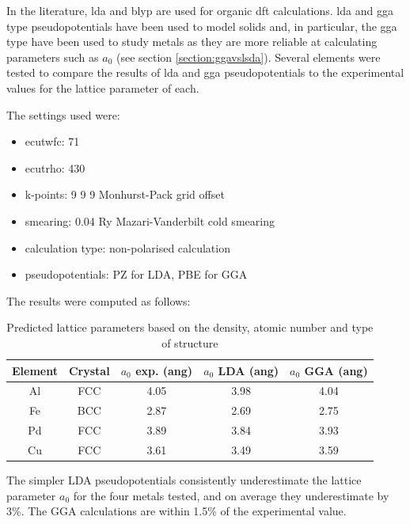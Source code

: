 In the literature, \acrshort{lda} and \acrshort{blyp} are used for organic \acrshort{dft} calculations.  \acrshort{lda} and \acrshort{gga} type pseudopotentials have been used to model solids and, in particular, the \acrshort{gga} type have been used to study metals as they are more reliable at calculating parameters such as $a_0$ (see section \ref{section:ggavslsda}).  Several elements were tested to compare the results of \acrshort{lda} and \acrshort{gga} pseudopotentials to the experimental values for the lattice parameter of each.

The settings used were:

\begin{itemize}
\item ecutwfc: 71 
\item ecutrho: 430 
\item k-points: 9 9 9 Monhurst-Pack grid offset
\item smearing: 0.04 Ry Mazari-Vanderbilt cold smearing
\item calculation type: non-polarised calculation
\item pseudopotentials: PZ for LDA, PBE for GGA
\end{itemize}

The results were computed as follows:

\begin{table}[h]
\begin{center}
\begin{tabular}{c c c c c}
\hline\hline
Element & Crystal & $a_0$ exp. (ang) & $a_0$ LDA (ang) & $a_0$ GGA (ang) \\
\hline\hline
Al     & FCC  &  4.05  &  3.98  &  4.04   \\ 
Fe     & BCC  &  2.87  &  2.69  &  2.75   \\ 
Pd     & FCC  &  3.89  &  3.84  &  3.93   \\ 
Cu     & FCC  &  3.61  &  3.49  &  3.59   \\ 
\hline\hline
\end{tabular}
\end{center}
\caption{Predicted lattice parameters based on the density, atomic number and type of structure}
\label{table:computedlattice}
\end{table}

The simpler LDA pseudopotentials consistently underestimate the lattice parameter $a_0$ for the four metals tested, and on average they underestimate by 3\%.  The GGA calculations are within 1.5\% of the experimental value.



